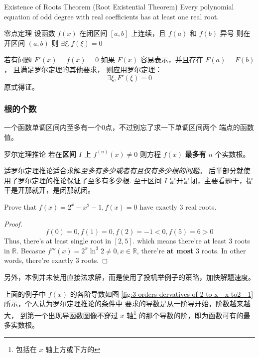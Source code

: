 \begin{definition} {Existence of Roots Theorem (Root Existential Theorem)} 
    Every polynomial equation of odd degree with real coefficients has at least one real root.
\end{definition}
\begin{definition}{零点定理}
    设函数 $f(x)$ 在闭区间 $\left[a, b\right]$ 上连续，且 $f(a)$ 和 $f(b)$ 异号
    则在开区间 $\left(a, b\right)$ 则 $\exists \xi, f(\xi) = 0$
\end{definition}

若有问题 $F'(x) = f(x) = 0$ 如果 $F(x)$ 容易表示，并且存在 $F(a)=F(b)$，
且满足罗尔定理的其他要求，
则应用罗尔定理：
\[
    \exists \xi, F'(\xi) = 0
\]
原式得证。

\subsubsection{根的个数} \label{number-of-roots-question}

一个函数单调区间内至多有一个0点，不过别忘了求一下单调区间两个
端点的函数值。

\begin{lemma}{罗尔定理推论}
    若在\textbf{区间 $I$} 上 $f^{(n)}(x) \neq 0$ 
    则方程 $f(x)$ \textbf{最多有} $n$ 个实数根。
\end{lemma}
适罗尔定理推论适合求解\emph{至多有多少或者有且仅有多少根的问题}。
后半部分就使用了罗尔定理的推论保证了至多有多少根.
至于区间 $I$ 是开是闭，主要看题干，提干是开那就开，是闭那就闭。

\begin{example}{\cite[page 77, pdf 88，例4]{we}}
    \label{ex:special-val-substitution}
    Prove that $f(x) = 2^x - x^2 - 1, f(x) = 0$ have exactly 3 real roots.
    \begin{proof}
        \[
            f(0) = 0, f(1) = 0, f(2) = -1 < 0, f(5) = 6 > 0
        \]
        Thus, there's at least single root in $[2, 5]$. 
        which means there're at least 3 roots in $\mathbb{R}$.
        Becasue $f'''(x) = 2^x \ln ^3 2 \neq 0, x \in \mathbb{R}$, there're \textbf{at most}
        3 roots.
        In other words, there're exactly 3 roots.
    \end{proof}
    另外，本例并未使用直接法求解，而是使用了投机举例子的策略，加快解题速度。
\end{example}

上面的例子中 $f(x)$ 的各阶导数如图
\ref{fig:3-orders-dervatives-of-2-to-x---x-to2---1} 
所示，个人认为罗尔定理推论的条件中 
要求的导数是从一阶导开始，阶数越来越大，
到第一个出现导函数图像不穿过 $x$ 轴\footnote{包括在 $x$ 轴上方或下方的}
的那个导数的阶，即为函数可有的最多实数根。

